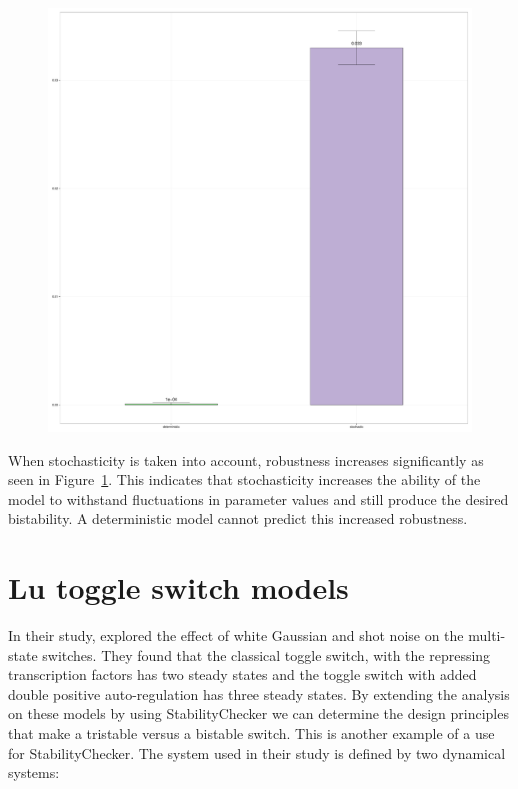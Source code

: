 \begin{figure}[p]
\centering
\includegraphics[scale=0.2]{images/Gardner/robustness_comparison_high_mean.pdf}
\caption{}
\label{fig:Gard_robst}
\end{figure}

 When stochasticity is taken into account, robustness increases significantly as seen in Figure~\ref{fig:Gard_robst}. This indicates that stochasticity increases the ability of the model to withstand fluctuations in parameter values and still produce the desired bistability. A deterministic model cannot predict this increased robustness.


\newpage
\section{Lu toggle switch models}

In their study, \textcite{Lu:2013br} explored the effect of white Gaussian and shot noise on the multi-state switches. They found that the classical toggle switch, with the repressing transcription factors has two steady states and the toggle switch with added double positive auto-regulation has three steady states. By extending the analysis on these models by using StabilityChecker we can determine the design principles that make a tristable versus a bistable switch. This is another example of a use for StabilityChecker.
The system used in their study is defined by two dynamical systems:

